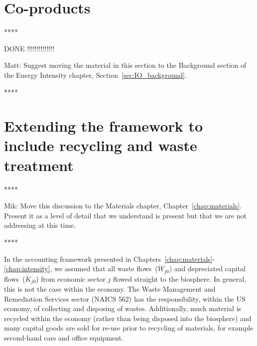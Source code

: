 \section{Co-products}
\label{sec:make-use}

**** 

DONE !!!!!!!!!!!!!!

Matt: Suggest moving the material in this section to the Background
section of the Energy Intensity chapter, Section~\ref{sec:IO_background}.

****

%


\section{Extending the framework to include recycling and waste treatment}
\label{sec:recycling_and_waste}

****

Mik: Move this discussion to the Materials chapter,
Chapter~\ref{chap:materials}.
Present it as a level of detail that we understand is present
but that we are not addressing at this time.

****

In the accounting framework presented in Chapters~\ref{chap:materials}-\ref{chap:intensity},
we assumed that all waste flows~($\dot{W}_{j0}$) and depreciated capital flows~($\dot{K}_{j0}$)
from economic sector $j$ flowed straight to the biosphere.
In general, this is not the case within the economy.
The Waste Management and Remediation Services sector (NAICS 562) has the responsibility,
within the US economy,
of collecting and disposing of wastes.
Additionally, much material is recycled within the economy 
(rather than being disposed into the biosphere)
and many capital goods are sold for re-use prior to recycling of materials,
for example second-hand cars and office equipment.

